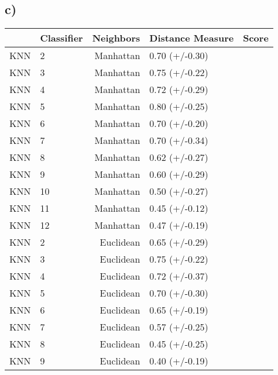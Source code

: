 \documentclass{article}
\begin{document}
          \subsection{c)}
            \begin{tabular}{llrll}
              \toprule
              {} & Classifier &  Neighbors &       Distance Measure &           Score \\
              \midrule
              KNN &          2 &              Manhattan &  0.70 (+/-0.30) \\
              KNN &          3 &              Manhattan &  0.75 (+/-0.22) \\
              KNN &          4 &              Manhattan &  0.72 (+/-0.29) \\
              KNN &          5 &              Manhattan &  0.80 (+/-0.25) \\
              KNN &          6 &              Manhattan &  0.70 (+/-0.20) \\
              KNN &          7 &              Manhattan &  0.70 (+/-0.34) \\
              KNN &          8 &              Manhattan &  0.62 (+/-0.27) \\
              KNN &          9 &              Manhattan &  0.60 (+/-0.29) \\
              KNN &         10 &              Manhattan &  0.50 (+/-0.27) \\
              KNN &         11 &              Manhattan &  0.45 (+/-0.12) \\
              KNN &         12 &              Manhattan &  0.47 (+/-0.19) \\
              KNN &          2 &              Euclidean &  0.65 (+/-0.29) \\
              KNN &          3 &              Euclidean &  0.75 (+/-0.22) \\
              KNN &          4 &              Euclidean &  0.72 (+/-0.37) \\
              KNN &          5 &              Euclidean &  0.70 (+/-0.30) \\
              KNN &          6 &              Euclidean &  0.65 (+/-0.19) \\
              KNN &          7 &              Euclidean &  0.57 (+/-0.25) \\
              KNN &          8 &              Euclidean &  0.45 (+/-0.25) \\
              KNN &          9 &              Euclidean &  0.40 (+/-0.19) \\

\end{tabular}
\end{document}
